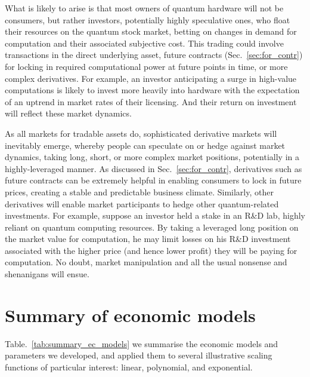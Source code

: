 What is likely to arise is that most owners of quantum hardware will not be consumers, but rather investors, potentially highly speculative ones, who float their resources on the quantum stock market, betting on changes in demand for computation and their associated subjective cost. This trading could involve transactions in the direct underlying asset, future contracts (Sec.~\ref{sec:for_contr}) for locking in required computational power at future points in time, or more complex derivatives. For example, an investor anticipating a surge in high-value computations is likely to invest more heavily into hardware with the expectation of an uptrend in market rates of their licensing. And their return on investment will reflect these market dynamics.

As all markets for tradable assets do, sophisticated derivative markets will inevitably emerge, whereby people can speculate on or hedge against market dynamics, taking long, short, or more complex market positions, potentially in a highly-leveraged manner. As discussed in Sec.~\ref{sec:for_contr}, derivatives such as future contracts can be extremely helpful in enabling consumers to lock in future prices, creating a stable and predictable business climate. Similarly, other derivatives will enable market participants to hedge other quantum-related investments. For example, suppose an investor held a stake in an R\&D lab, highly reliant on quantum computing resources. By taking a leveraged long position on the market value for computation, he may limit losses on his R\&D investment associated with the higher price (and hence lower profit) they will be paying for computation. No doubt, market manipulation and all the usual nonsense and shenanigans will ensue.

%
%

\section{Summary of economic models}\label{sec:summary_economic_models}

 Table.~\ref{tab:summary_ec_models} we summarise the economic models and parameters we developed, and applied them to several illustrative scaling functions of particular interest: linear, polynomial, and exponential.


